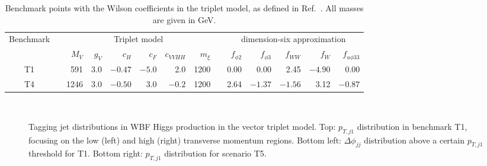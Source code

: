\begin{table}[b!]
  \renewcommand{\arraystretch}{1.2}
  \setlength{\tabcolsep}{0.5em}
  \centering
    \begin{tabular}{c c rrrrrr  c rrrrr}
      \toprule
      \multirow{2}{*}{Benchmark} &\hspace*{1em}& \multicolumn{6}{c}{Triplet model} &\hspace*{1em}&  \multicolumn{5}{c}{dimension-six approximation}  \\
      \cmidrule{3-8} \cmidrule{10-14}
      && $M_V$ & $g_V$ & $c_H$ & ${c}_{F}$ & ${c}_{VVHH}$  & $m_\xi$ && $f_{\phi 2}$ & $f_{\phi 3}$ & $f_{WW}$ & $f_W$ & $f_{u \phi 33}$ \\
      \midrule
      T1 && 591 & 3.0 & $-0.47$ & $-5.0$ & 2.0 & 1200 && 0.00 & 0.00 & 2.45 & $-4.90$ & 0.00 \\
      T4 && 1246 & 3.0 & $-0.50$ & $3.0$ & $-0.2$ & 1200 && 2.64 & $-1.37$ & $-1.56$ & 3.12 & $-0.87$ \\
      \bottomrule
    \end{tabular}
  \caption{Benchmark points with the Wilson coefficients in the
    triplet model, as defined in Ref.~\cite{too_long}.  All masses are
    given in GeV.}
  \label{tab:benchmarks}
\end{table}


\begin{figure}[t] \centering
   \\
  \caption{Tagging jet distributions in WBF Higgs production in the
vector triplet model.  Top: $p_{T,j1}$ distribution in benchmark T1,
focusing on the low (left) and high (right) transverse momentum
regions.  Bottom left: $\Delta \phi_{jj}$ distribution above a certain
$p_{T,j1}$ threshold for T1.  Bottom right: $p_{T,j1}$ distribution
for scenario T5.}
  \label{fig:validity_triplet_wbf}
\end{figure}

